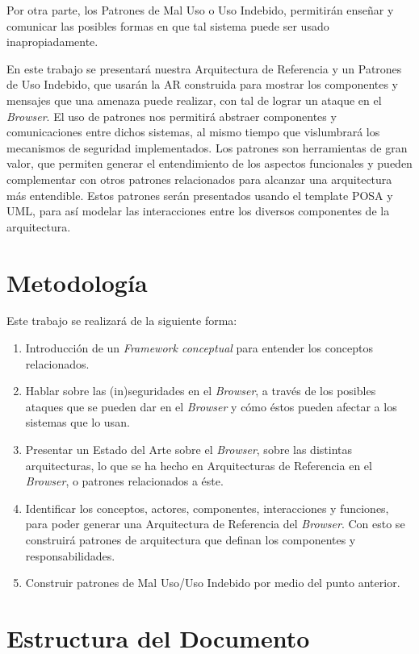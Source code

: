 Por otra parte, los Patrones de Mal Uso o Uso Indebido, permitirán enseñar y comunicar las posibles formas en que tal sistema puede ser usado inapropiadamente.

En este trabajo se presentará nuestra Arquitectura de Referencia y un Patrones de Uso Indebido, que usarán la AR construida para mostrar los componentes y mensajes que una amenaza puede realizar, con tal de lograr un ataque en el \textit{Browser}. El uso de patrones nos permitirá abstraer componentes y comunicaciones entre dichos sistemas, al mismo tiempo que vislumbrará los mecanismos de seguridad implementados. Los patrones son herramientas de gran valor, que permiten generar el entendimiento de los aspectos funcionales y pueden complementar con otros patrones relacionados para alcanzar una arquitectura más entendible. Estos patrones serán presentados usando el template POSA \cite{buschman1996system} y UML, para así modelar las interacciones entre los diversos componentes de la arquitectura.

\section{Metodología}
\label{chap1:Met}
Este trabajo se realizará de la siguiente forma:
\begin{enumerate}
	\item Introducción de un \textit{Framework conceptual} para entender los conceptos relacionados.
	\item Hablar sobre las (in)seguridades en el \textit{Browser}, a través de los posibles ataques que se pueden dar en el \textit{Browser} y cómo éstos pueden afectar a los sistemas que lo usan.
	\item Presentar un Estado del Arte sobre el \textit{Browser}, sobre las distintas arquitecturas, lo que se ha hecho en Arquitecturas de Referencia en el \textit{Browser}, o patrones relacionados a éste.
	\item Identificar los conceptos, actores, componentes, interacciones y funciones, para poder generar una Arquitectura de Referencia del \textit{Browser}. Con esto se construirá patrones de arquitectura que definan los componentes y responsabilidades.
	\item Construir patrones de Mal Uso/Uso Indebido por medio del punto anterior.
\end{enumerate}

\section{Estructura del Documento}
\label{chap1:estruct}

